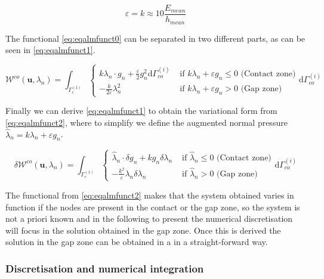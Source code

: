 \documentclass[a4paper,10pt]{article} %
\begin{document}
\begin{equation}\label{eq:eqcoeff}
 \varepsilon = k \approx 10 \frac{E_{mean}}{h_{mean}}
\end{equation}

The functional \eqref{eq:eqalmfunct0} can be separated in two different parts, as can be seen in \eqref{eq:eqalmfunct1}.

\begin{equation}\label{eq:eqalmfunct1}
  \mathcal{W}^{co}(\mathbf{u},\lambda_n) = \int_{\Gamma_c^{(1)}} \begin{cases}  k \lambda_n \cdot g_n  + \frac{\varepsilon}{2} g_n^2 \text{d}\Gamma_{co}^{(i)} & \text{ if } k\lambda_n +\varepsilon g_n \leq 0 \text{ (Contact zone)} \\ - \frac{k}{2\varepsilon} \lambda_n^2   & \text{ if } k\lambda_n +\varepsilon g_n > 0 \text{ (Gap zone)} \end{cases}\text{d}\Gamma_{co}^{(i)}
\end{equation}

Finally we can derive \eqref{eq:eqalmfunct1} to obtain the variational form from \eqref{eq:eqalmfunct2}, where to simplify we define the augmented normal pressure $\hat{\lambda}_{n} = k\lambda_n +\varepsilon g_n $.

\begin{equation}\label{eq:eqalmfunct2}
  \delta \mathcal{W}^{co}(\mathbf{u},\lambda_n) = \int_{\Gamma_c^{(1)}}\begin{cases}  \hat{\lambda}_{n} \cdot \delta g_n + k g_n \delta\lambda_n & \text{ if } \hat{\lambda}_{n} \leq 0 \text{ (Contact zone)} \\  - \frac{k^2}{\varepsilon} \lambda_n \delta\lambda_n & \text{ if } \hat{\lambda}_{n} > 0 \text{ (Gap zone)} \end{cases} \text{d}\Gamma_{co}^{(i)}
\end{equation}

The functional from \eqref{eq:eqalmfunct2} makes that the system obtained varies in function if the nodes are present in the contact or the gap zone, so the system is not a priori known and in the following to present the numerical discretisation will focus in the solution obtained in the gap zone. Once this is derived the solution in the gap zone can be obtained in a in a straight-forward way.

\subsubsection{Discretisation and numerical integration}
\end{document}
